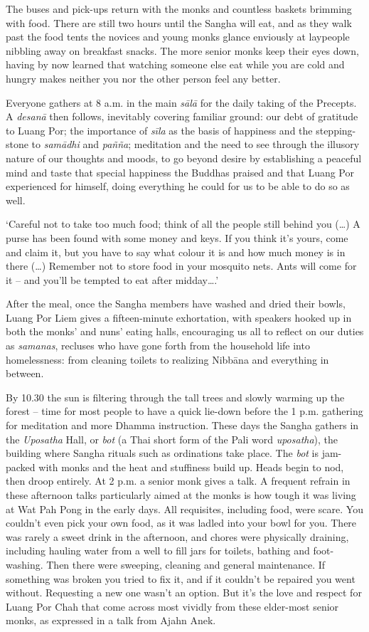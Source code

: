 The buses and pick-ups return with the monks and countless baskets
brimming with food. There are still two hours until the Sangha will eat, 
and as they walk past the food tents the novices and young monks glance
enviously at laypeople nibbling away on breakfast snacks. The more
senior monks keep their eyes down, having by now learned that watching
someone else eat while you are cold and hungry makes neither you nor the
other person feel any better. 

Everyone gathers at 8 a.m. in the main \emph{sālā} for the daily taking
of the Precepts. A \emph{desanā} then follows, inevitably covering
familiar ground: our debt of gratitude to Luang Por; the importance of
\emph{sīla} as the basis of happiness and the stepping-stone to
\emph{samādhi} and \emph{pañña}; meditation and the need to see through
the illusory nature of our thoughts and moods, to go beyond desire by
establishing a peaceful mind and taste that special happiness the
Buddhas praised and that Luang Por experienced for himself, doing
everything he could for us to be able to do so as well. 

`Careful not to take too much food; think of all the people still behind
you (\ldots{}) A purse has been found with some money and keys. If you
think it's yours, come and claim it, but you have to say what colour it
is and how much money is in there (\ldots{}) Remember not to store food
in your mosquito nets. Ants will come for it -- and you'll be tempted to
eat after midday\ldots{}.'

After the meal, once the Sangha members have washed and dried their
bowls, Luang Por Liem gives a fifteen-minute exhortation, with speakers
hooked up in both the monks' and nuns' eating halls, encouraging us all
to reflect on our duties as \emph{samanas}, recluses who have gone forth
from the household life into homelessness: from cleaning toilets to
realizing Nibbāna and everything in between. 

By 10.30 the sun is filtering through the tall trees and slowly warming
up the forest -- time for most people to have a quick lie-down before
the 1 p.m. gathering for meditation and more Dhamma instruction. These
days the Sangha gathers in the \emph{Uposatha} Hall, or \emph{bot} (a
Thai short form of the Pali word \emph{uposatha}), the building where
Sangha rituals such as ordinations take place. The \emph{bot} is
jam-packed with monks and the heat and stuffiness build up. Heads begin
to nod, then droop entirely. At 2 p.m. a senior monk gives a talk. A
frequent refrain in these afternoon talks particularly aimed at the
monks is how tough it was living at Wat Pah Pong in the early days. All
requisites, including food, were scare. You couldn't even pick your own
food, as it was ladled into your bowl for you. There was rarely a sweet
drink in the afternoon, and chores were physically draining, including
hauling water from a well to fill jars for toilets, bathing and
foot-washing. Then there were sweeping, cleaning and general
maintenance. If something was broken you tried to fix it, and if it
couldn't be repaired you went without. Requesting a new one wasn't an
option. But it's the love and respect for Luang Por Chah that come
across most vividly from these elder-most senior monks, as expressed in
a talk from Ajahn Anek. 

